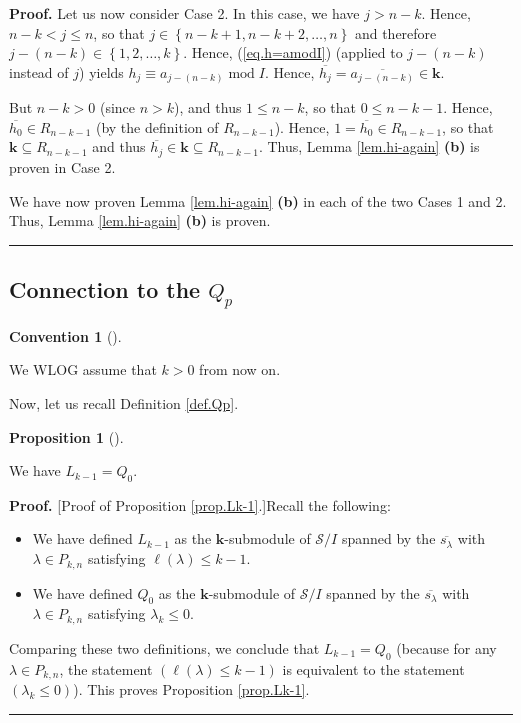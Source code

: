 \documentclass[numbers=enddot,12pt,final,onecolumn,notitlepage]{scrartcl}%
\theoremstyle{definition}
\newtheorem{prop}[theo]{Proposition}
\newenvironment{proposition}[1][]
{\begin{prop}[#1]\begin{leftbar}}
{\end{leftbar}\end{prop}}
\newtheorem{conv}[theo]{Convention}
\newenvironment{convention}[1][]
{\begin{conv}[#1]\begin{leftbar}}
{\end{leftbar}\end{conv}}
\newenvironment{proof}[1][Proof]{\noindent\textbf{#1.} }{\ \rule{0.5em}{0.5em}}
\newenvironment{convention}[1][Convention]{\noindent\textbf{#1.} }{\ \rule{0.5em}{0.5em}}
\newenvironment{convention}[1][Convention]{\noindent\textbf{#1.} }{\ \rule{0.5em}{0.5em}}
\begin{document}
\begin{proof}
Let us now consider Case 2. In this case, we have $j>n-k$. Hence, $n-k<j\leq
n$, so that $j\in\left\{  n-k+1,n-k+2,\ldots,n\right\}  $ and therefore
$j-\left(  n-k\right)  \in\left\{  1,2,\ldots,k\right\}  $. Hence,
(\ref{eq.h=amodI}) (applied to $j-\left(  n-k\right)  $ instead of $j$) yields
$h_{j}\equiv a_{j-\left(  n-k\right)  }\operatorname{mod}I$. Hence,
$\overline{h_{j}}=\overline{a_{j-\left(  n-k\right)  }}\in\mathbf{k}$.

But $n-k>0$ (since $n>k$), and thus $1\leq n-k$, so that $0\leq n-k-1$. Hence,
$\overline{h_{0}}\in R_{n-k-1}$ (by the definition of $R_{n-k-1}$). Hence,
$1=\overline{h_{0}}\in R_{n-k-1}$, so that $\mathbf{k}\subseteq R_{n-k-1}$ and
thus $\overline{h_{j}}\in\mathbf{k}\subseteq R_{n-k-1}$. Thus, Lemma
\ref{lem.hi-again} \textbf{(b)} is proven in Case 2.

We have now proven Lemma \ref{lem.hi-again} \textbf{(b)} in each of the two
Cases 1 and 2. Thus, Lemma \ref{lem.hi-again} \textbf{(b)} is proven.
\end{proof}

\subsection{Connection to the $Q_{p}$}

\begin{convention}
We WLOG assume that $k>0$ from now on.
\end{convention}

Now, let us recall Definition \ref{def.Qp}.

\begin{proposition}
\label{prop.Lk-1}We have $L_{k-1}=Q_{0}$.
\end{proposition}

\begin{proof}
[Proof of Proposition \ref{prop.Lk-1}.]Recall the following:

\begin{itemize}
\item We have defined $L_{k-1}$ as the $\mathbf{k}$-submodule of
$\mathcal{S}/I$ spanned by the $\overline{s_{\lambda}}$ with $\lambda\in
P_{k,n}$ satisfying $\ell\left(  \lambda\right)  \leq k-1$.

\item We have defined $Q_{0}$ as the $\mathbf{k}$-submodule of $\mathcal{S}/I$
spanned by the $\overline{s_{\lambda}}$ with $\lambda\in P_{k,n}$ satisfying
$\lambda_{k}\leq0$.
\end{itemize}

Comparing these two definitions, we conclude that $L_{k-1}=Q_{0}$ (because for
any $\lambda\in P_{k,n}$, the statement $\left(  \ell\left(  \lambda\right)
\leq k-1\right)  $ is equivalent to the statement $\left(  \lambda_{k}%
\leq0\right)  $). This proves Proposition \ref{prop.Lk-1}.
\end{proof}
\end{document}

